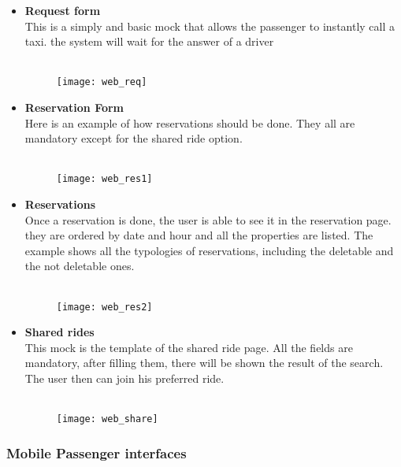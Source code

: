 \begin{itemize}
\item \textbf{Request form} \\ This is a simply and basic mock that allows the passenger to instantly call a taxi. the system will wait for the answer of a driver \\ \\
\begin{figure}[h]
	\centering	
	\texttt{[image: web\_req]}
\end{figure}
\newpage

\item \textbf{Reservation Form} \\ Here is an example of how reservations should be done. They all are mandatory except for the shared ride option. \\ \\
\begin{figure}[h]
	\centering	
	\texttt{[image: web\_res1]}
\end{figure}
\newpage

\item \textbf{Reservations} \\ Once a reservation is done, the user is able to see it in the reservation page. they are ordered by date and hour and all the properties are listed. The example shows all the typologies of reservations, including the deletable and the not deletable ones. \\ \\
\begin{figure}[h]
	\centering	
	\texttt{[image: web\_res2]}
\end{figure}
\newpage

\item \textbf{Shared rides} \\ This mock is the template of the shared ride page. All the fields are mandatory, after filling them, there will be shown the result of the search. The user then can join his preferred ride. \\ \\
\begin{figure}[h]
	\centering	
	\texttt{[image: web\_share]}
\end{figure}
\end{itemize}
\newpage
	


\subsubsection{Mobile Passenger interfaces}

